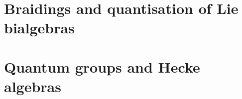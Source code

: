         \chapter{Braidings and quantisation of Lie bialgebras}
            \begin{abstract}
                
            \end{abstract}
            
            \minitoc
        
            

        \chapter{Quantum groups and Hecke algebras}
            \begin{abstract}
                
            \end{abstract}
            
            \minitoc

            
	
    \printbibliography

